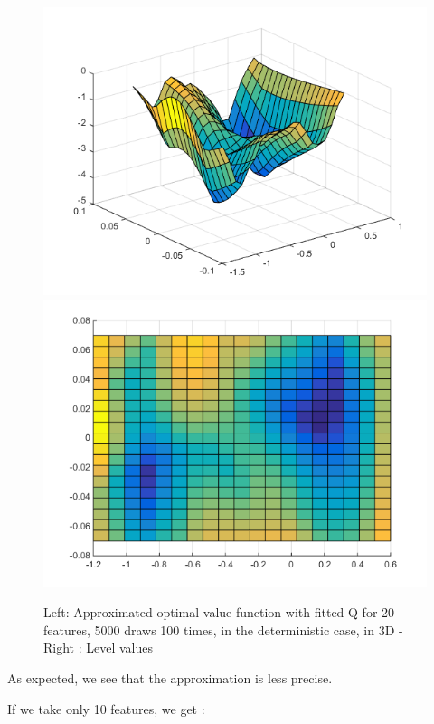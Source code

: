 \documentclass[a4paper, 12pt]{article}
\begin{document}
\begin{figure}[H]
	\centering
	\noindent\includegraphics[scale=0.3]{fittedQ-5ep-5000draws-deterministic.png}
	\noindent\includegraphics[scale=0.3]{fittedQ-5ep-5000draws-deterministic-levels.png}
	\caption{Left: Approximated optimal value function with fitted-Q for 20 features, 5000 draws 100 times, in the deterministic case, in 3D - Right : Level values}
\end{figure}

As expected, we see that the approximation is less precise.

If we take only 10 features, we get :
\end{document}
